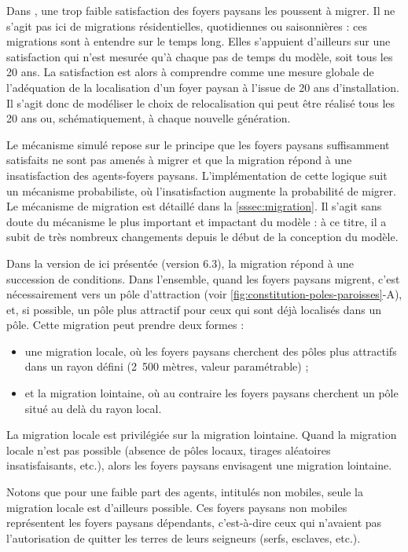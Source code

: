 \begin{tcolorbox}[breakable,left=0pt,right=0pt,top=0pt,bottom=0pt,
	colback=gray!15,colframe=gray!15,width=\dimexpr\textwidth\relax, 
	enlarge left by=0mm, boxsep=5pt,arc=0pt,outer arc=0pt]
Dans \simfeodal{}, une trop faible satisfaction des foyers paysans les poussent à migrer.
Il ne s'agit pas ici de migrations résidentielles, quotidiennes ou saisonnières : ces migrations sont à entendre sur le temps long.
Elles s'appuient d'ailleurs sur une satisfaction qui n'est mesurée qu'à chaque pas de temps du modèle, soit tous les 20 ans.
La satisfaction est alors à comprendre comme une mesure globale de l'adéquation de la localisation d'un foyer paysan à l'issue de 20 ans d'installation.
Il s'agit donc de modéliser le choix de relocalisation qui peut être réalisé tous les 20 ans ou, schématiquement, à chaque nouvelle génération.

\medskip
Le mécanisme simulé repose sur le principe que les foyers paysans suffisamment satisfaits ne sont pas amenés à migrer et que la migration répond à une insatisfaction des agents-foyers paysans.
L'implémentation de cette logique suit un mécanisme probabiliste, où l'insatisfaction augmente la probabilité de migrer.
Le mécanisme de migration est détaillé dans la \cref{sssec:migration}.
Il s'agit sans doute du mécanisme le plus important et impactant du modèle \simfeodal{} : à ce titre, il a subit de très nombreux changements depuis le début de la conception du modèle.

\medskip
Dans la version de \simfeodal{} ici présentée (version 6.3), la migration répond à une succession de conditions.
Dans l'ensemble, quand les foyers paysans migrent, c'est nécessairement vers un pôle d'attraction (voir \cref{fig:constitution-poles-paroisses}-A), et, si possible, un pôle plus attractif pour ceux qui sont déjà localisés dans un pôle.
Cette migration peut prendre deux formes :
\begin{itemize}
	\item une migration \og locale\fg{}, où les foyers paysans cherchent des pôles plus attractifs dans un rayon défini (2~500 mètres, valeur paramétrable) ;
	\item et la migration \og lointaine\fg{}, où au contraire les foyers paysans cherchent un pôle situé au delà du rayon local.
\end{itemize} 

La migration locale est privilégiée sur la migration lointaine.
Quand la migration locale n'est pas possible (absence de pôles locaux, tirages aléatoires insatisfaisants, etc.), alors les foyers paysans envisagent une migration lointaine.

Notons que pour une faible part des agents, intitulés \og non mobiles\fg{}, seule la migration locale est d'ailleurs possible.
Ces foyers paysans \og non mobiles\fg{} représentent les foyers paysans dépendants, c'est-à-dire ceux qui n'avaient pas l'autorisation de quitter les terres de leurs seigneurs (serfs, esclaves, etc.).
\end{tcolorbox}

